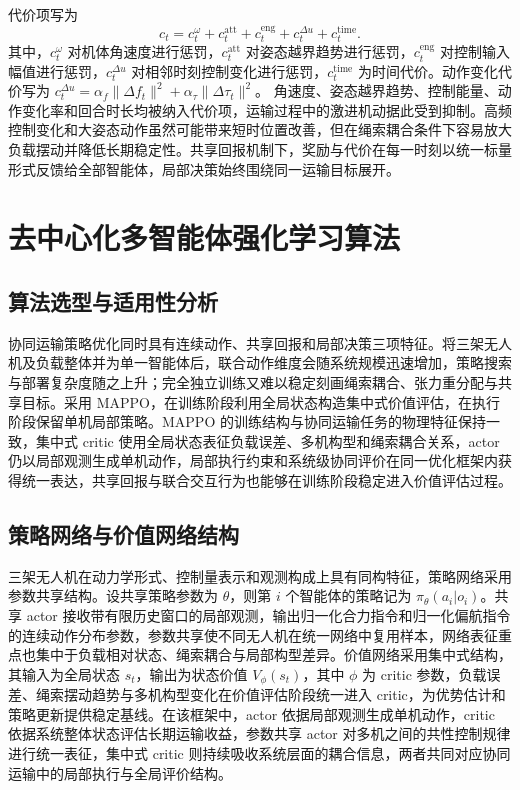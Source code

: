 代价项写为
\begin{equation}
    c_t =
    c_t^{\omega}
    + c_t^{\mathrm{att}}
    + c_t^{\mathrm{eng}}
    + c_t^{\Delta u}
    + c_t^{\mathrm{time}}.
\end{equation}
其中，$c_t^{\omega}$ 对机体角速度进行惩罚，$c_t^{\mathrm{att}}$ 对姿态越界趋势进行惩罚，$c_t^{\mathrm{eng}}$ 对控制输入幅值进行惩罚，$c_t^{\Delta u}$ 对相邻时刻控制变化进行惩罚，$c_t^{\mathrm{time}}$ 为时间代价。动作变化代价写为 $c_t^{\Delta u} = \alpha_f \|\Delta f_t\|^2 + \alpha_{\tau}\|\Delta \tau_t\|^2$。
角速度、姿态越界趋势、控制能量、动作变化率和回合时长均被纳入代价项，运输过程中的激进机动据此受到抑制。高频控制变化和大姿态动作虽然可能带来短时位置改善，但在绳索耦合条件下容易放大负载摆动并降低长期稳定性。共享回报机制下，奖励与代价在每一时刻以统一标量形式反馈给全部智能体，局部决策始终围绕同一运输目标展开。

\section{去中心化多智能体强化学习算法}

\subsection{算法选型与适用性分析}

协同运输策略优化同时具有连续动作、共享回报和局部决策三项特征。将三架无人机及负载整体并为单一智能体后，联合动作维度会随系统规模迅速增加，策略搜索与部署复杂度随之上升；完全独立训练又难以稳定刻画绳索耦合、张力重分配与共享目标。采用 MAPPO，在训练阶段利用全局状态构造集中式价值评估，在执行阶段保留单机局部策略。MAPPO 的训练结构与协同运输任务的物理特征保持一致，集中式 critic 使用全局状态表征负载误差、多机构型和绳索耦合关系，actor 仍以局部观测生成单机动作，局部执行约束和系统级协同评价在同一优化框架内获得统一表达，共享回报与联合交互行为也能够在训练阶段稳定进入价值评估过程。

\subsection{策略网络与价值网络结构}

三架无人机在动力学形式、控制量表示和观测构成上具有同构特征，策略网络采用参数共享结构。设共享策略参数为 $\theta$，则第 $i$ 个智能体的策略记为 $\pi_{\theta}(a_i|o_i)$。共享 actor 接收带有限历史窗口的局部观测，输出归一化合力指令和归一化偏航指令的连续动作分布参数，参数共享使不同无人机在统一网络中复用样本，网络表征重点也集中于负载相对状态、绳索耦合与局部构型差异。价值网络采用集中式结构，其输入为全局状态 $s_t$，输出为状态价值 $V_{\phi}(s_t)$，其中 $\phi$ 为 critic 参数，负载误差、绳索摆动趋势与多机构型变化在价值评估阶段统一进入 critic，为优势估计和策略更新提供稳定基线。在该框架中，actor 依据局部观测生成单机动作，critic 依据系统整体状态评估长期运输收益，参数共享 actor 对多机之间的共性控制规律进行统一表征，集中式 critic 则持续吸收系统层面的耦合信息，两者共同对应协同运输中的局部执行与全局评价结构。


